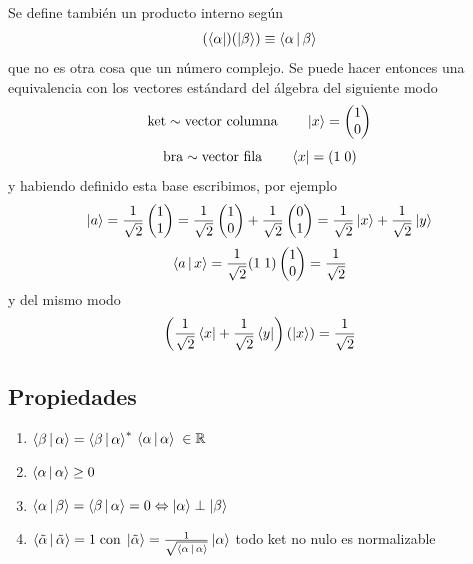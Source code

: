 \documentclass[10pt,oneside]{CBFT_book}
\begin{document}
Se define también un producto interno según
\[
	(\Bra{\alpha})(\Ket{\beta}) \equiv \Braket{\alpha|\beta}
\]
que no es otra cosa que un número complejo. Se puede hacer entonces una equivalencia con los vectores
estándard del álgebra del siguiente modo 
\[
	\text{ket} \sim \text{vector columna} \qquad \Ket{x} = \begin{pmatrix}
	                                                       1 \\
	                                                       0 \\
	                                                      \end{pmatrix}
\]
\[
	\text{bra} \sim \text{vector fila} \qquad \Bra{x} = ( 1 \; 0 )          
\]
y habiendo definido esta base escribimos, por ejemplo
\[
	\Ket{a} = \frac{1}{\sqrt{2}} \begin{pmatrix} 1 \\ 1  \\ \end{pmatrix}  =
	\frac{1}{\sqrt{2}} \begin{pmatrix} 1 \\ 0  \\ \end{pmatrix}  + 
	\frac{1}{\sqrt{2}} \begin{pmatrix} 0 \\ 1  \\ \end{pmatrix} =
	\frac{1}{\sqrt{2}} \Ket{x} + \frac{1}{\sqrt{2}} \Ket{y} 
\]
\[
	\Braket{a|x} = \frac{1}{\sqrt{2}}( 1 \; 1)\begin{pmatrix} 1 \\ 0  \\ \end{pmatrix} = \frac{1}{\sqrt{2}}
\]
y del mismo modo
\[
	\left( \frac{1}{\sqrt{2}} \Bra{x} + \frac{1}{\sqrt{2}} \Bra{y}  \right)
	\left( \Ket{x} \right)= \frac{1}{\sqrt{2}}
\]

\subsection{Propiedades}

\begin{enumerate}
 \item $\Braket{\beta|\alpha} = \Braket{\beta|\alpha}^*$  $ \Braket{\alpha|\alpha} \; \in \mathbb{R}$
 \item $\Braket{\alpha|\alpha} \geq 0$ 
 \item $\Braket{\alpha|\beta} = \Braket{\beta|\alpha} = 0 \Leftrightarrow \Ket{\alpha} \perp \Ket{\beta}$
 \item $\Braket{\tilde{\alpha}|\tilde{\alpha}} = 1 \; \text{con} \; 
 \Ket{\tilde{\alpha}} = \frac{1}{\sqrt{\Braket{\alpha|\alpha}}}\Ket{\alpha} $ todo ket no nulo es normalizable
\end{enumerate}
\end{document}
